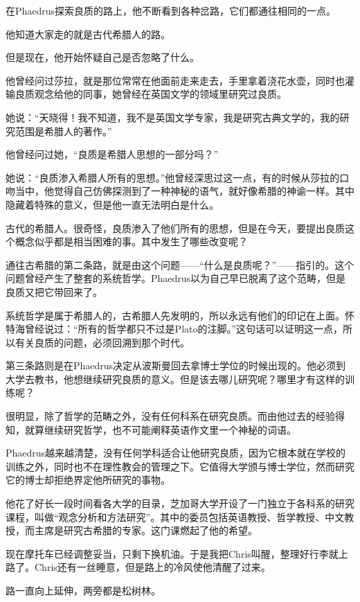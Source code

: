 \documentclass[UTF8]{article}
\begin{document}
\par 在Phaedrus探索良质的路上，他不断看到各种岔路，它们都通往相同的一点。
\par 他知道大家走的就是古代希腊人的路。
\par 但是现在，他开始怀疑自己是否忽略了什么。
\par 他曾经问过莎拉，就是那位常常在他面前走来走去，手里拿着浇花水壶，同时也灌输良质观念给他的同事，她曾经在英国文学的领域里研究过良质。
\par 她说：“天晓得！我不知道，我不是英国文学专家，我是研究古典文学的，我的研究范围是希腊人的著作。”
\par 他曾经问过她，“良质是希腊人思想的一部分吗？”
\par 她说：“良质渗入希腊人所有的思想。”他曾经深思过这一点，有的时候从莎拉的口吻当中，他觉得自己仿佛探测到了一种神秘的语气，就好像希腊的神谕一样。其中隐藏着特殊的意义，但是他一直无法明白是什么。
\par 古代的希腊人。很奇怪，良质渗入了他们所有的思想，但是在今天，要提出良质这个概念似乎都是相当困难的事。其中发生了哪些改变呢？
\par 通往古希腊的第二条路，就是由这个问题——“什么是良质呢？”——指引的。这个问题曾经产生了整套的系统哲学。Phaedrus以为自己早已脱离了这个范畴，但是良质又把它带回来了。
\par 系统哲学是属于希腊人的，古希腊人先发明的，所以永远有他们的印记在上面。怀特海曾经说过：“所有的哲学都只不过是Plato的注脚。”这句话可以证明这一点，所以有关良质的问题，必须回溯到那个时代。
\par 第三条路则是在Phaedrus决定从波斯曼回去拿博士学位的时候出现的。他必须到大学去教书，他想继续研究良质的意义。但是该去哪儿研究呢？哪里才有这样的训练呢？
\par 很明显，除了哲学的范畴之外，没有任何科系在研究良质。而由他过去的经验得知，就算继续研究哲学，也不可能阐释英语作文里一个神秘的词语。
\par Phaedrus越来越清楚，没有任何学科适合让他研究良质，因为它根本就在学校的训练之外，同时也不在理性教会的管理之下。它值得大学颁与博士学位，然而研究它的博士却拒绝界定他所研究的事物。
\par 他花了好长一段时间看各大学的目录，芝加哥大学开设了一门独立于各科系的研究课程，叫做“观念分析和方法研究”。其中的委员包括英语教授、哲学教授、中文教授，而主席是研究古希腊的专家。这门课燃起了他的希望。
\par 现在摩托车已经调整妥当，只剩下换机油。于是我把Chris叫醒，整理好行李就上路了。Chris还有一丝睡意，但是路上的冷风使他清醒了过来。
\par 路一直向上延伸，两旁都是松树林。
\end{document}

